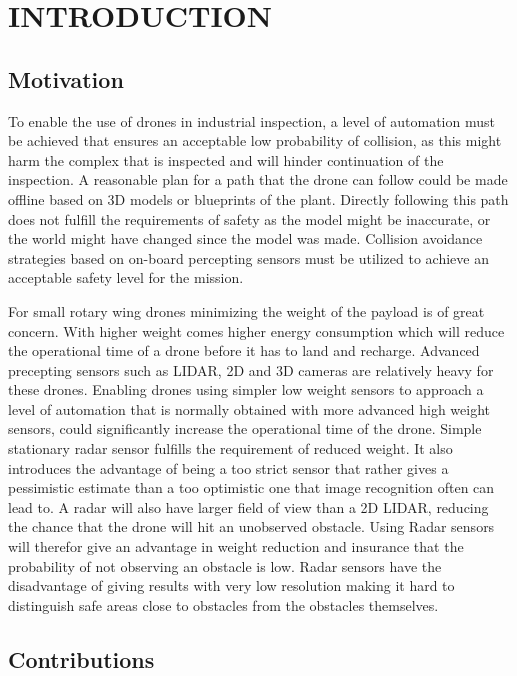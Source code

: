 \section{INTRODUCTION}
\subsection{Motivation}

To enable the use of drones in industrial inspection, a level of automation must be achieved that ensures an acceptable low probability of collision, as this might harm the complex that is inspected and will hinder continuation of the inspection. A reasonable plan for a path that the drone can follow could be made offline based on 3D models or blueprints of the plant. Directly following this path does not fulfill the requirements of safety as the model might be inaccurate, or the world might have changed since the model was made. Collision avoidance strategies based on on-board percepting sensors must be utilized to achieve an acceptable safety level for the mission.

For small rotary wing drones minimizing the weight of the payload is of great concern. With higher weight comes higher energy consumption which will reduce the operational time of a drone before it has to land and recharge. Advanced precepting sensors such as LIDAR, 2D and 3D cameras are relatively heavy for these drones. Enabling drones using simpler low weight sensors to approach a level of automation that is normally obtained with more advanced high weight sensors, could significantly increase the operational time of the drone. Simple stationary radar sensor fulfills the requirement of reduced weight. It also introduces the advantage of being a too strict sensor that rather gives a pessimistic estimate than a too optimistic one that image recognition often can lead to. A radar will also have larger field of view than a 2D LIDAR, reducing the chance that the drone will hit an unobserved obstacle. Using Radar sensors will therefor give an advantage in weight reduction and insurance that the probability of not observing an obstacle is low. Radar sensors have the disadvantage of giving results with very low resolution making it hard to distinguish safe areas close to obstacles from the obstacles themselves. 


\subsection{Contributions}
